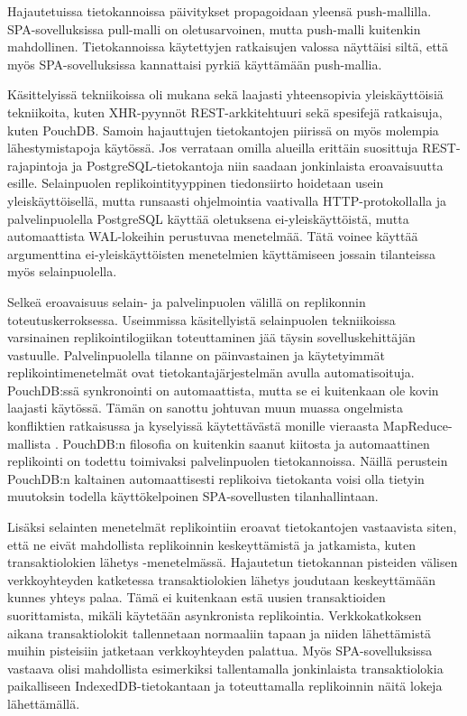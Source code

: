 \documentclass[finnish,twoside,censored,csm,sw-track-2018]{HYthesisML}
\begin{document}
Hajautetuissa tietokannoissa päivitykset propagoidaan yleensä push-mallilla. SPA-sovelluksissa pull-malli on oletusarvoinen, mutta push-malli kuitenkin mahdollinen. Tietokannoissa käytettyjen ratkaisujen valossa näyttäisi siltä, että myös SPA-sovelluksissa kannattaisi pyrkiä käyttä\-mään push-mallia.

Käsittelyissä tekniikoissa oli mukana sekä laajasti yhteensopivia yleiskäyttöisiä tekniikoita, kuten XHR-pyynnöt REST-arkkitehtuuri sekä spesifejä ratkaisuja, kuten PouchDB. Samoin hajauttujen tietokantojen piirissä on myös molempia lähestymistapoja käytössä. Jos verrataan omilla alueilla erittäin suosittuja REST-rajapintoja ja PostgreSQL-tietokantoja niin saadaan jonkinlaista eroavaisuutta esille. Selainpuolen replikointityyppinen tiedonsiirto hoidetaan usein yleiskäyttöisellä, mutta runsaasti ohjelmointia vaativalla HTTP-protokollalla ja palvelinpuolella PostgreSQL käyttää oletuksena ei-yleiskäyttöistä, mutta automaattista WAL-lokeihin perustuvaa menetelmää. Tätä voinee käyttää argumenttina ei-yleiskäyttöisten menetelmien käyttämiseen jossain tilanteissa myös selainpuolella.

Selkeä eroavaisuus selain- ja palvelinpuolen välillä on replikonnin toteutuskerroksessa. Useimmissa käsitellyistä selainpuolen tekniikoissa varsinainen replikointilogiikan toteuttaminen jää täysin sovelluskehittäjän vastuulle. Palvelinpuolella tilanne on päinvastainen ja käytetyimmät replikointimenetelmät ovat tietokantajärjestelmän avulla automatisoituja. PouchDB:ssä synkronointi on automaattista, mutta se ei kuitenkaan ole kovin laajasti käytössä. Tämän on sanottu johtuvan muun muassa ongelmista konfliktien ratkaisussa ja kyselyissä käytettävästä monille vieraasta MapReduce-mallista \citep{local-first}. PouchDB:n filosofia on kuitenkin saanut kiitosta \citep{local-first} ja automaattinen replikointi on todettu toimivaksi palvelinpuolen tietokannoissa. Näillä perustein PouchDB:n kaltainen automaattisesti replikoiva tietokanta voisi olla tietyin muutoksin todella käyttökelpoinen SPA-sovellusten tilanhallintaan.

Lisäksi selainten menetelmät replikointiin eroavat tietokantojen vastaavista siten, että ne eivät mahdollista replikoinnin keskeyttämistä ja jatkamista, kuten transaktiolokien lähetys -menetelmässä. Hajautetun tietokannan pisteiden välisen verkkoyhteyden katketessa transaktiolokien lähetys joudutaan keskeyttämään kunnes yhteys palaa. Tämä ei kuitenkaan estä uusien transaktioiden suorittamista, mikäli käytetään asynkronista replikointia. Verkkokatkoksen aikana transaktiolokit tallennetaan normaaliin tapaan ja niiden lähettämistä muihin pisteisiin jatketaan verkkoyhteyden palattua. Myös SPA-sovelluksissa vastaava olisi mahdollista esimerkiksi tallentamalla jonkinlaista transaktiolokia paikalliseen IndexedDB-tietokantaan ja toteuttamalla replikoinnin näitä lokeja lähettämällä.
\end{document}
